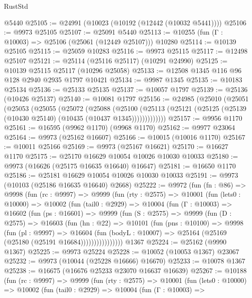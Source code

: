 \begin{lexlean}{RustStd}
\begin{coremodule}
    @5440
@25105 := @24991 (@10023 (@10192 (@12442 (@10032 @5441))))
@25106 := @9973 @25105
@25107 := @25091 @5440
@25113 := @10255 (fun (Γ : @10003) => @25106 (@25061 (@12449 @25107))) @10280
@25114 := @10139 @25105
@25115 := @25059 @10283
@25116 := @9973 @25115
@25117 := @12498 @25107
@25121 := @25114 (@25116 @25117) (@10291 @24990)
@25125 := @10139 @25115 @25117 (@10296 @25058)
@25133 := @12508 @1345 @116 @96 @128 @2940 @2935 @1797 @10421
@25134 := @9987 @1345
@25135 := @10183 @25134
@25136 := @25133 @25135
@25137 := @10057 @1797
@25139 := @25136 (@10426 @25137)
@25140 := @10081 @1797
@25156 := @24985
    (@25010
      (@25051
        (@25053
          (@25055
            (@25072
              (@25088
                (@25100
                  (@25113 (@25121 (@25125 (@25139 (@10430 @25140) (@10435 (@10437 @1345)))))))))))))
@25157 := @9956 @1170
@25161 := @16595 (@9962 @1170) (@9968 @1170)
@25162 := @9977 @23064
@25164 := @9973 (@25162 @16607)
@25166 := @10015 (@10016 @1170)
@25167 := @10011 @25166
@25169 := @9973 (@25167 @16621)
@25170 := @16627 @1170
@25175 := @25170 @16629 @10054 @10026 @10030 @10033
@25180 := @9973 (@16626 (@25175 @16635 @16640) @16647)
@25181 := @16650 @1170
@25186 := @25181 @16629 @10054 @10026 @10030 @10033
@25191 := @9973 (@10103 (@25186 @16635 @16640) @2668)
@25222 := @9972
    (fun (fn : @86) =>
    @9998
      (fun (rc : @9997) =>
      @9999
        (fun (rty : @2575) =>
        @10001
          (fun (lets0 : @10000) =>
          @10002
            (fun (tail0 : @2929) =>
            @10004
              (fun (Γ : @10003) =>
              @16602
                (fun (ps : @16601) =>
                @9999
                  (fun (S : @2575) =>
                  @9999
                    (fun (D : @2575) =>
                    @16603
                      (fun (hn : @22) =>
                      @10101
                        (fun (pns : @10100) =>
                        @9998
                          (fun (pl : @9997) =>
                          @16604
                            (fun (bodyL : @10007) =>
                            @25164 (@25169 (@25180 (@25191 @16684))))))))))))))))
    @1367
@25224 := @25162 (@9990 @1367)
@25225 := @9973 @25224
@25228 := @10052 (@10053 @1367) @23067
@25232 := @9973 (@10044 (@25228 @16666) @16670)
@25233 := @10078 @1367
@25238 := @16675 (@16676 @25233 @23070 @16637 @16639)
@25267 := @10188
    (fun (rc : @9997) =>
    @9999
      (fun (rty : @2575) =>
      @10001
        (fun (lets0 : @10000) =>
        @10002
          (fun (tail0 : @2929) =>
          @10004
            (fun (Γ : @10003) =>

\end{coremodule}
\end{lexlean}
